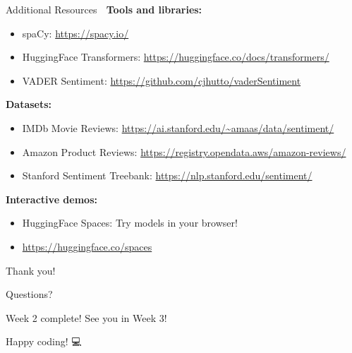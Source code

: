 \documentclass[aspectratio=169]{beamer}
\begin{document}
\begin{frame}[shrink=10]{Additional Resources 🔗}
    \textbf{Tools and libraries:}
    \begin{itemize}\setlength{\itemsep}{0pt}
        \item spaCy: \url{https://spacy.io/}
        \item HuggingFace Transformers: \url{https://huggingface.co/docs/transformers/}
        \item VADER Sentiment: \url{https://github.com/cjhutto/vaderSentiment}
    \end{itemize}

    \vspace{0.5em}
    \textbf{Datasets:}
    \begin{itemize}\setlength{\itemsep}{0pt}
        \item IMDb Movie Reviews: \url{https://ai.stanford.edu/~amaas/data/sentiment/}
        \item Amazon Product Reviews: \url{https://registry.opendata.aws/amazon-reviews/}
        \item Stanford Sentiment Treebank: \url{https://nlp.stanford.edu/sentiment/}
    \end{itemize}

    \vspace{0.5em}
    \textbf{Interactive demos:}
    \begin{itemize}\setlength{\itemsep}{0pt}
        \item HuggingFace Spaces: Try models in your browser!
        \item \url{https://huggingface.co/spaces}
    \end{itemize}
\end{frame}

\begin{frame}[standout]
    \Huge Thank you! 🎉

    \vspace{1em}

    \large Questions?

    \vspace{1em}

    \normalsize
    Week 2 complete! See you in Week 3!

    \vspace{0.5em}

    Happy coding! 💻
\end{frame}
\end{document}
